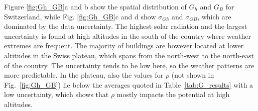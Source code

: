 \begin{table}[tb]
\centering
\footnotesize
\caption{Results for the estimation of $G_h$, $G_B$ and $G_D$, showing the monthly predicted values (in kWh/m$^2$) and the model ($\sigma_M$) and data ($\sigma_D$) uncertainties (no distinction for $G_D$), as percentage of the monthly radiation.}
\label{tab:G_results}
\end{table}

Figure \ref{fig:Gh_GB}a and b show the spatial distribution of $G_h$ and $G_B$ for Switzerland, while Fig. \ref{fig:Gh_GB}c and d show $\sigma_{Gh}$ and $\sigma_{GB}$, which are dominated by the data uncertainty. The highest solar radiation and the largest uncertainty is found at high altitudes in the south of the country where weather extremes are frequent. The majority of buildings are however located at lower altitudes in the Swiss plateau, which spans from the north-west to the north-east of the country. The uncertainty tends to be low here, so the weather patterns are more predictable. In the plateau, also the values for $\rho$ (not shown in Fig.~\ref{fig:Gh_GB}) lie below the averages quoted in Table~\ref{tab:G_results} with a low uncertainty, which shows that $\rho$ mostly impacts the potential at high altitudes.

